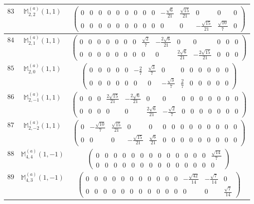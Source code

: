 \documentclass[fleqn,8pt,landscape]{jsarticle}
\begin{document}
\begin{center}
\begin{longtable}{ccc}
$ 83 $ & $ \mathbb{M}_{2,2}^{(a)}(1,1) $ & $ \begin{pmatrix} 0 & 0 & 0 & 0 & 0 & 0 & 0 & 0 & 0 & - \frac{\sqrt{6}}{21} & \frac{\sqrt{15}}{21} & 0 & 0 & 0 \\ 0 & 0 & 0 & 0 & 0 & 0 & 0 & 0 & 0 & 0 & 0 & - \frac{\sqrt{15}}{21} & \frac{\sqrt{10}}{7} & 0 \end{pmatrix} $ \\ \hline
$ 84 $ & $ \mathbb{M}_{2,1}^{(a)}(1,1) $ & $ \begin{pmatrix} 0 & 0 & 0 & 0 & 0 & 0 & 0 & \frac{\sqrt{2}}{7} & - \frac{2 \sqrt{6}}{21} & 0 & 0 & 0 & 0 & 0 \\ 0 & 0 & 0 & 0 & 0 & 0 & 0 & 0 & 0 & \frac{2 \sqrt{6}}{21} & - \frac{2 \sqrt{15}}{21} & 0 & 0 & 0 \end{pmatrix} $ \\ \hline
$ 85 $ & $ \mathbb{M}_{2,0}^{(a)}(1,1) $ & $ \begin{pmatrix} 0 & 0 & 0 & 0 & 0 & - \frac{2}{7} & \frac{\sqrt{3}}{7} & 0 & 0 & 0 & 0 & 0 & 0 & 0 \\ 0 & 0 & 0 & 0 & 0 & 0 & 0 & - \frac{\sqrt{3}}{7} & \frac{2}{7} & 0 & 0 & 0 & 0 & 0 \end{pmatrix} $ \\ \hline
$ 86 $ & $ \mathbb{M}_{2,-1}^{(a)}(1,1) $ & $ \begin{pmatrix} 0 & 0 & 0 & \frac{2 \sqrt{15}}{21} & - \frac{2 \sqrt{6}}{21} & 0 & 0 & 0 & 0 & 0 & 0 & 0 & 0 & 0 \\ 0 & 0 & 0 & 0 & 0 & \frac{2 \sqrt{6}}{21} & - \frac{\sqrt{2}}{7} & 0 & 0 & 0 & 0 & 0 & 0 & 0 \end{pmatrix} $ \\ \hline
$ 87 $ & $ \mathbb{M}_{2,-2}^{(a)}(1,1) $ & $ \begin{pmatrix} 0 & - \frac{\sqrt{10}}{7} & \frac{\sqrt{15}}{21} & 0 & 0 & 0 & 0 & 0 & 0 & 0 & 0 & 0 & 0 & 0 \\ 0 & 0 & 0 & - \frac{\sqrt{15}}{21} & \frac{\sqrt{6}}{21} & 0 & 0 & 0 & 0 & 0 & 0 & 0 & 0 & 0 \end{pmatrix} $ \\ \hline
$ 88 $ & $ \mathbb{M}_{4,4}^{(a)}(1,-1) $ & $ \begin{pmatrix} 0 & 0 & 0 & 0 & 0 & 0 & 0 & 0 & 0 & 0 & 0 & 0 & 0 & \frac{\sqrt{14}}{7} \\ 0 & 0 & 0 & 0 & 0 & 0 & 0 & 0 & 0 & 0 & 0 & 0 & 0 & 0 \end{pmatrix} $ \\ \hline
$ 89 $ & $ \mathbb{M}_{4,3}^{(a)}(1,-1) $ & $ \begin{pmatrix} 0 & 0 & 0 & 0 & 0 & 0 & 0 & 0 & 0 & 0 & 0 & - \frac{\sqrt{42}}{14} & - \frac{\sqrt{7}}{14} & 0 \\ 0 & 0 & 0 & 0 & 0 & 0 & 0 & 0 & 0 & 0 & 0 & 0 & 0 & \frac{\sqrt{7}}{14} \end{pmatrix} $ \\ \hline

\end{longtable}
\end{center}
\end{document}
